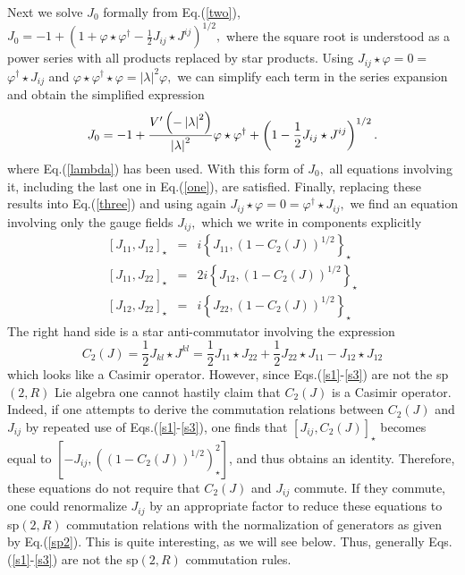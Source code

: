 \documentclass[a4paper,12pt]{article}
\begin{document}
Next we solve $J_{0}$ formally from Eq.(\ref{two}), $J_{0}=-1+\left(
1+\varphi \star \varphi ^{\dagger }-\frac{1}{2}J_{ij}\star J^{ij}\right)
^{1/2},$ where the square root is understood as a power series with all
products replaced by star products. Using $J_{ij}\star \varphi =0=$ $\varphi
^{\dagger }\star J_{ij}$ and $\varphi \star \varphi ^{\dagger }\star \varphi
=\left| \lambda \right| ^{2}\varphi ,$ we can simplify each term in the
series expansion and obtain the simplified expression 
\begin{equation}
J_{0}=-1+\frac{V^{\prime }\left( -\left| \lambda \right| ^{2}\right) }{%
\left| \lambda \right| ^{2}}\varphi \star \varphi ^{\dagger }+\left( 1-\frac{%
1}{2}J_{ij}\star J^{ij}\right) ^{1/2}.  \label{Jo}
\end{equation}
where Eq.(\ref{lambda}) has been used. With this form of $J_{0},$ all
equations involving it, including the last one in Eq.(\ref{one}), are
satisfied. Finally, replacing these results into Eq.(\ref{three}) and using
again $J_{ij}\star \varphi =0=\varphi ^{\dagger }\star J_{ij},$ we find an
equation involving only the gauge fields $J_{ij},$ which we write in
components explicitly 
\begin{eqnarray}
\left[ J_{11},J_{12}\right] _{\star } &=&i\left\{ J_{11},\left(
1-C_{2}\left( J\right) \right) ^{1/2}\right\} _{\star }  \label{s1} \\
\left[ J_{11},J_{22}\right] _{\star } &=&2i\left\{ J_{12},\left(
1-C_{2}\left( J\right) \right) ^{1/2}\right\} _{\star }  \label{s2} \\
\left[ J_{12},J_{22}\right] _{\star } &=&i\left\{ J_{22},\left(
1-C_{2}\left( J\right) \right) ^{1/2}\right\} _{\star }  \label{s3}
\end{eqnarray}
The right hand side is a star anti-commutator involving the expression 
\begin{equation}
C_{2}\left( J\right) =\frac{1}{2}J_{kl}\star J^{kl}=\frac{1}{2}J_{11}\star
J_{22}+\frac{1}{2}J_{22}\star J_{11}-J_{12}\star J_{12}
\end{equation}
which looks like a Casimir operator. However, since Eqs.(\ref{s1}-\ref{s3})
are not the sp$\left( 2,R\right) $ Lie algebra one cannot hastily claim that 
$C_{2}\left( J\right) $ is a Casimir operator. Indeed, if one attempts to
derive the commutation relations between $C_{2}\left( J\right) $ and $J_{ij}$
by repeated use of Eqs.(\ref{s1}-\ref{s3}), one finds that $\left[
J_{ij},C_{2}\left( J\right) \right] _{\star }$ becomes equal to $\left[
-J_{ij},\left( \left( 1-C_{2}\left( J\right) \right) ^{1/2}\right) _{\star
}^{2}\right] $, and thus obtains an identity. Therefore, these equations do
not require that $C_{2}\left( J\right) $ and $J_{ij}$ commute. If they
commute, one could renormalize $J_{ij}$ by an appropriate factor to reduce
these equations to sp$\left( 2,R\right) $ commutation relations with the
normalization of generators as given by Eq.(\ref{sp2}). This is quite
interesting, as we will see below. Thus, generally Eqs.(\ref{s1}-\ref{s3})
are not the sp$\left( 2,R\right) $ commutation rules.
\end{document}
